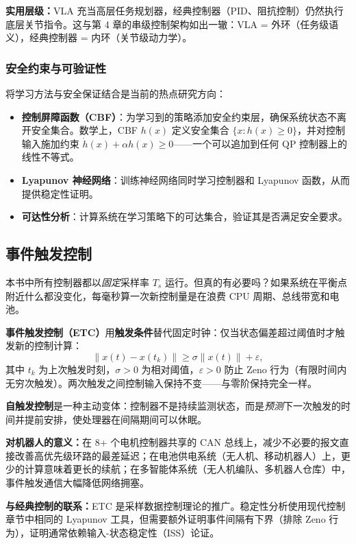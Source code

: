 \textbf{实用层级：}VLA 充当高层任务规划器，经典控制器（PID、阻抗控制）仍然执行底层关节指令。这与第 4 章的串级控制架构如出一辙：VLA = 外环（任务级语义），经典控制器 = 内环（关节级动力学）。

\subsubsection{安全约束与可验证性}

将学习方法与安全保证结合是当前的热点研究方向：
\begin{itemize}[nosep]
    \item \textbf{控制屏障函数（CBF）}：为学习到的策略添加安全约束层，确保系统状态不离开安全集合。数学上，CBF $h(x)$ 定义安全集合 $\{x : h(x) \geq 0\}$，并对控制输入施加约束 $\dot{h}(x) + \alpha h(x) \geq 0$——一个可以追加到任何 QP 控制器上的线性不等式。
    \item \textbf{Lyapunov 神经网络}：训练神经网络同时学习控制器和 Lyapunov 函数，从而提供稳定性证明。
    \item \textbf{可达性分析}：计算系统在学习策略下的可达集合，验证其是否满足安全要求。
\end{itemize}

\subsection{事件触发控制}

本书中所有控制器都以\emph{固定}采样率 $T_s$ 运行。但真的有必要吗？如果系统在平衡点附近什么都没变化，每毫秒算一次新控制量是在浪费 CPU 周期、总线带宽和电池。

\textbf{事件触发控制（ETC）}用\textbf{触发条件}替代固定时钟：仅当状态偏差超过阈值时才触发新的控制计算：
\[
\|x(t) - x(t_k)\| \geq \sigma \|x(t)\| + \varepsilon,
\]
其中 $t_k$ 为上次触发时刻，$\sigma > 0$ 为相对阈值，$\varepsilon > 0$ 防止 Zeno 行为（有限时间内无穷次触发）。两次触发之间控制输入保持不变——与零阶保持完全一样。

\textbf{自触发控制}是一种主动变体：控制器不是持续监测状态，而是\emph{预测}下一次触发的时间并提前安排，使处理器在间隔期间可以休眠。

\textbf{对机器人的意义：}在 8+ 个电机控制器共享的 CAN 总线上，减少不必要的报文直接改善高优先级环路的最差延迟；在电池供电系统（无人机、移动机器人）上，更少的计算意味着更长的续航；在多智能体系统（无人机编队、多机器人仓库）中，事件触发通信大幅降低网络拥塞。

\textbf{与经典控制的联系：}ETC 是采样数据控制理论的推广。稳定性分析使用现代控制章节中相同的 Lyapunov 工具，但需要额外证明事件间隔有下界（排除 Zeno 行为），证明通常依赖输入-状态稳定性（ISS）论证。

